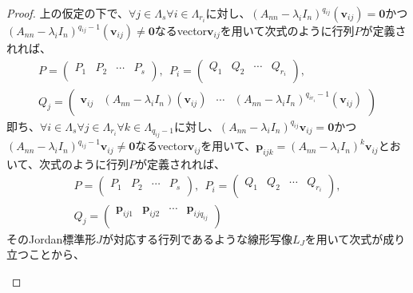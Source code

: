 \documentclass[dvipdfmx]{jsarticle}
\begin{document}
\begin{proof}
上の仮定の下で、$\forall j \in \varLambda_{s}\forall i \in \varLambda_{r_{i}}$に対し、$\left( A_{nn} - \lambda_{i}I_{n} \right)^{q_{ij}}\left( \mathbf{v}_{ij} \right) = \mathbf{0}$かつ$\left( A_{nn} - \lambda_{i}I_{n} \right)^{q_{ij} - 1}\left( \mathbf{v}_{ij} \right) \neq \mathbf{0}$なるvector$\mathbf{v}_{ij}$を用いて次式のように行列$P$が定義されれば、
\begin{align*}
P = \begin{pmatrix}
P_{1} & P_{2} & \cdots & P_{s} \\
\end{pmatrix},\ \ P_{i} = \begin{pmatrix}
Q_{1} & Q_{2} & \cdots & Q_{r_{i}} \\
\end{pmatrix},\\
Q_{j} = \begin{pmatrix}
\mathbf{v}_{ij} & \left( A_{nn} - \lambda_{i}I_{n} \right)\left( \mathbf{v}_{ij} \right) & \cdots & \left( A_{nn} - \lambda_{i}I_{n} \right)^{q_{ir_{i}} - 1}\left( \mathbf{v}_{ij} \right) \\
\end{pmatrix}
\end{align*}
即ち、$\forall i \in \varLambda_{s}\forall j \in \varLambda_{r_{i}}\forall k \in \varLambda_{q_{ij} - 1}$に対し、$\left( A_{nn} - \lambda_{i}I_{n} \right)^{q_{ij}}\mathbf{v}_{ij} = \mathbf{0}$かつ$\left( A_{nn} - \lambda_{i}I_{n} \right)^{q_{ij} - 1}\mathbf{v}_{ij} \neq \mathbf{0}$なるvector$\mathbf{v}_{ij}$を用いて、$\mathbf{p}_{ijk} = \left( A_{nn} - \lambda_{i}I_{n} \right)^{k}\mathbf{v}_{ij}$とおいて、次式のように行列$P$が定義されれば、
\begin{align*}
P = \begin{pmatrix}
P_{1} & P_{2} & \cdots & P_{s} \\
\end{pmatrix},\ \ P_{i} = \begin{pmatrix}
Q_{1} & Q_{2} & \cdots & Q_{r_{i}} \\
\end{pmatrix},\\
Q_{j} = \begin{pmatrix}
\mathbf{p}_{ij1} & \mathbf{p}_{ij2} & \cdots & \mathbf{p}_{ijq_{ij}} \\
\end{pmatrix}
\end{align*}
そのJordan標準形$J$が対応する行列であるような線形写像$L_{J}$を用いて次式が成り立つことから、
\begin{center}
  \begin{tikzpicture}[auto]


\end{tikzpicture}
\end{center}
\end{proof}
\end{document}
